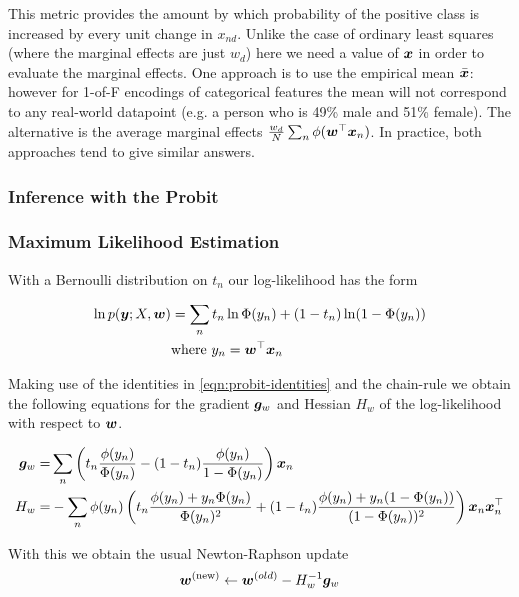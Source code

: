 This metric provides the amount by which probability of the positive class is increased by every unit change in $x_{nd}$. Unlike the case of ordinary least squares (where the marginal effects are just $w_d$) here we need a value of $\bm x$ in order to evaluate the marginal effects. One approach is to use the empirical mean $\bar{\bm x}$: however for 1-of-F encodings of categorical features the mean will not correspond to any real-world datapoint (e.g. a person who is 49\% male and 51\% female). The alternative is the average marginal effects $\frac{w_d}{N}\sum_n\phi(\bm w^\top\bm x_n)$. In practice, both approaches tend to give similar answers.



\subsubsection{Inference with the Probit}
\subsubsection*{Maximum Likelihood Estimation}
With a Bernoulli distribution on $t_n$ our log-likelihood has the form

\begin{align}
\ln p(\bm y; X, \bm w) & = \sum_n t_n \ln \Phi(y_n) + (1 - t_n) \ln (1 - \Phi(y_n)) \\
& \text{where } y_n = \bm w^\top\bm x_n
\end{align}

Making use of the identities in \eqref{eqn:probit-identities} and the chain-rule we obtain the following equations for the gradient $\bm g_w$ and Hessian $H_w$ of the log-likelihood with respect to $\bm w$.

\begin{align}
\bm g_w = & \sum_n \left( t_n \frac{\phi(y_n)}{\Phi(y_n)} - (1 - t_n) \frac{\phi(y_n)}{1 - \Phi(y_n)} \right) \bm x_n \label{eqn:probit-gradient}\\
H_w = & - \sum_n \phi(y_n) \left(
    t_n \frac{\phi(y_n) + y_n \Phi(y_n)}{\Phi(y_n)^2} + (1-t_n) \frac{\phi(y_n) + y_n (1-\Phi(y_n))}{(1 - \Phi(y_n))^2}
\right) \bm x_n \bm x_n^\top \label{eqn:probit-hessian}
\end{align}

With this we obtain the usual Newton-Raphson update
\begin{align}
\bm w^{(\text{new})} \leftarrow \bm w^{(old)} - H_w^{-1} \bm g_w
\end{align}

